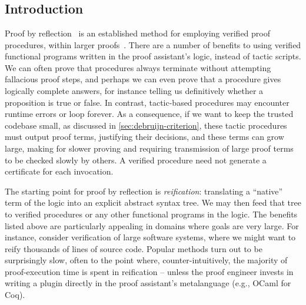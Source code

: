 \chapter{}\label{ch:reflection}

\section{Introduction}\label{sec:reification-by-parametricity:intro}


Proof by reflection~\cite{ReflectionTACS97} is an established method for employing verified proof procedures, within larger proofs~\cite{MirrorShardITP14,malecha2013mirror-shard,Speeding2017Malecha,gonthier2016small}.
There are a number of benefits to using verified functional programs written in the proof assistant's logic, instead of tactic scripts.
We can often prove that procedures always terminate without attempting fallacious proof steps, and perhaps we can even prove that a procedure gives logically complete answers, for instance telling us definitively whether a proposition is true or false.
In contrast, tactic-based procedures may encounter runtime errors or loop forever.
As a consequence, if we want to keep the trusted codebase small, as discussed in \autoref{sec:debruijn-criterion}, these tactic procedures must output proof terms, justifying their decisions, and these terms can grow large, making for slower proving and requiring transmission of large proof terms to be checked slowly by others.
A verified procedure need not generate a certificate for each invocation.

The starting point for proof by reflection is \emph{reification}: translating a ``native'' term of the logic into an explicit abstract syntax tree.
We may then feed that tree to verified procedures or any other functional programs in the logic.
The benefits listed above are particularly appealing in domains where goals are very large.
For instance, consider verification of large software systems, where we might want to reify thousands of lines of source code.
Popular methods turn out to be surprisingly slow, often to the point where, counter-intuitively, the majority of proof-execution time is spent in reification -- unless the proof engineer invests in writing a plugin directly in the proof assistant's metalanguage (e.g., OCaml for Coq).

